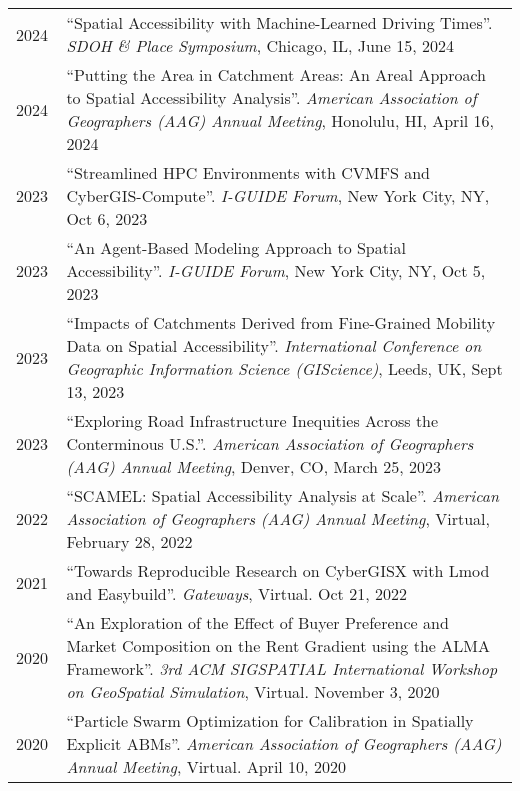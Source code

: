 \documentclass{acmcv}
\begin{document}
    \begin{longtable}{p{0.1\linewidth} p{0.9\linewidth}}
        2024 & ``Spatial Accessibility with Machine-Learned Driving Times''. \textit{SDOH \& Place Symposium}, Chicago, IL, June 15, 2024\\

        2024 & ``Putting the Area in Catchment Areas: An Areal Approach to Spatial Accessibility Analysis''. \textit{American Association of Geographers (AAG) Annual Meeting}, Honolulu, HI, April 16, 2024\\

        2023 & ``Streamlined HPC Environments with CVMFS and CyberGIS-Compute''. \textit{I-GUIDE Forum}, New York City, NY, Oct 6, 2023\\

        2023 & ``An Agent-Based Modeling Approach to Spatial Accessibility''. \textit{I-GUIDE Forum}, New York City, NY, Oct 5, 2023\\

        2023 & ``Impacts of Catchments Derived from Fine-Grained Mobility Data on Spatial Accessibility''. \textit{International Conference on Geographic Information Science (GIScience)}, Leeds, UK, Sept 13, 2023\\

        2023 & ``Exploring Road Infrastructure Inequities Across the Conterminous U.S.''. \textit{American Association of Geographers (AAG) Annual Meeting}, Denver, CO, March 25, 2023\\

        2022 & ``SCAMEL: Spatial Accessibility Analysis at Scale''. \textit{American Association of Geographers (AAG) Annual Meeting}, Virtual, February 28, 2022\\

        2021 & ``Towards Reproducible Research on CyberGISX with Lmod and Easybuild''. \textit{Gateways}, Virtual. Oct 21, 2022\\

        2020 & ``An Exploration of the Effect of Buyer Preference and Market Composition on the Rent Gradient using the ALMA Framework''. \textit{3rd ACM SIGSPATIAL International Workshop on GeoSpatial Simulation}, Virtual. November 3, 2020 \\

        2020 & ``Particle Swarm Optimization for Calibration in Spatially Explicit ABMs''. \textit{American Association of Geographers (AAG) Annual Meeting}, Virtual. April 10, 2020 \\


\end{longtable}
\end{document}
